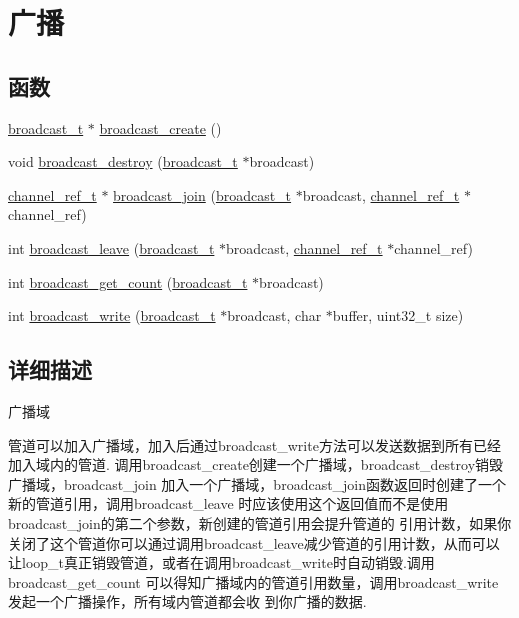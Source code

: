 \hypertarget{group__broadcast}{}\section{广播}
\label{group__broadcast}
\subsection*{函数}
\begin{DoxyCompactItemize}
\item 
\hyperlink{struct__broadcast__t}{broadcast\+\_\+t} $\ast$ \hyperlink{group__broadcast_gaa3b09fb6ff3281cb10736c0aabac18fc}{broadcast\+\_\+create} ()
\item 
void \hyperlink{group__broadcast_gaa28451fa4656633ded0c7b966ff159c3}{broadcast\+\_\+destroy} (\hyperlink{struct__broadcast__t}{broadcast\+\_\+t} $\ast$broadcast)
\item 
\hyperlink{struct__channel__ref__t}{channel\+\_\+ref\+\_\+t} $\ast$ \hyperlink{group__broadcast_ga1c736809a1d0e4b7c77b617ac8ce590d}{broadcast\+\_\+join} (\hyperlink{struct__broadcast__t}{broadcast\+\_\+t} $\ast$broadcast, \hyperlink{struct__channel__ref__t}{channel\+\_\+ref\+\_\+t} $\ast$channel\+\_\+ref)
\item 
int \hyperlink{group__broadcast_gad846ced37d33b750f61a88565eaed9a4}{broadcast\+\_\+leave} (\hyperlink{struct__broadcast__t}{broadcast\+\_\+t} $\ast$broadcast, \hyperlink{struct__channel__ref__t}{channel\+\_\+ref\+\_\+t} $\ast$channel\+\_\+ref)
\item 
int \hyperlink{group__broadcast_gacd045b1ca8be7fa8fac6e337934acc97}{broadcast\+\_\+get\+\_\+count} (\hyperlink{struct__broadcast__t}{broadcast\+\_\+t} $\ast$broadcast)
\item 
int \hyperlink{group__broadcast_ga0e8a8826a84c9c93a96e0fda1ca846aa}{broadcast\+\_\+write} (\hyperlink{struct__broadcast__t}{broadcast\+\_\+t} $\ast$broadcast, char $\ast$buffer, uint32\+\_\+t size)
\end{DoxyCompactItemize}


\subsection{详细描述}
广播域


\begin{DoxyPre}
管道可以加入广播域，加入后通过broadcast\_write方法可以发送数据到所有已经加入域内的管道.
调用broadcast\_create创建一个广播域，broadcast\_destroy销毁广播域，broadcast\_join
加入一个广播域，broadcast\_join函数返回时创建了一个新的管道引用，调用broadcast\_leave
时应该使用这个返回值而不是使用broadcast\_join的第二个参数，新创建的管道引用会提升管道的
引用计数，如果你关闭了这个管道你可以通过调用broadcast\_leave减少管道的引用计数，从而可以
让loop\_t真正销毁管道，或者在调用broadcast\_write时自动销毁.调用broadcast\_get\_count
可以得知广播域内的管道引用数量，调用broadcast\_write发起一个广播操作，所有域内管道都会收
到你广播的数据.
\end{DoxyPre}
 

